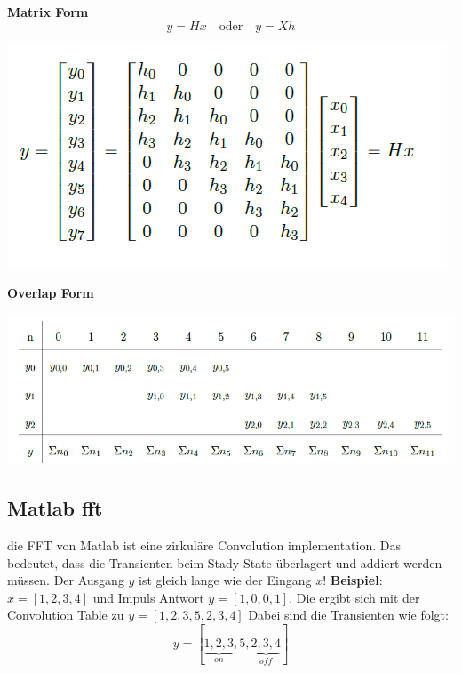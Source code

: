 \textbf{Matrix Form}
\[
y = Hx \quad \text{oder} \quad y = Xh
\]
\begin{center}
	\includegraphics[width=0.7\columnwidth]{Images/matrix}
\end{center}

\textbf{Overlap Form}
\begin{center}
	\includegraphics[width=\columnwidth]{Images/overlap}
\end{center}


\subsection{Matlab fft}
die FFT von Matlab ist eine zirkuläre Convolution implementation. Das bedeutet, dass die Transienten beim Stady-State überlagert und addiert werden müssen. Der Ausgang $y$ ist gleich lange wie der Eingang $x$!
\textbf{Beispiel}:
$x=[1, 2, 3, 4]$ und Impuls Antwort $y=[1, 0, 0, 1]$. Die ergibt sich mit der Convolution Table zu $y=[1, 2, 3, 5, 2, 3, 4]$ Dabei sind die Transienten wie folgt:
\[
y=[\underbrace{1, 2, 3}_{on}, 5, \underbrace{2, 3, 4}_{off}]
\]

